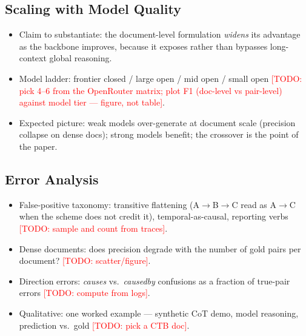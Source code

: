 \documentclass[11pt]{article}
\newcommand{\todo}[1]{\textcolor{red}{[TODO: #1]}}
\begin{document}
\subsection{Scaling with Model Quality}
\begin{itemize}
  \item Claim to substantiate: the document-level formulation \emph{widens} its
        advantage as the backbone improves, because it exposes rather than
        bypasses long-context global reasoning.
  \item Model ladder: frontier closed / large open / mid open / small open
        \todo{pick 4--6 from the OpenRouter matrix; plot F1 (doc-level vs
        pair-level) against model tier --- figure, not table}.
  \item Expected picture: weak models over-generate at document scale
        (precision collapse on dense docs); strong models benefit; the
        crossover is the point of the paper.
\end{itemize}

\subsection{Error Analysis}
\begin{itemize}
  \item False-positive taxonomy: transitive flattening (A$\to$B$\to$C read as
        A$\to$C when the scheme does not credit it), temporal-as-causal,
        reporting verbs \todo{sample and count from traces}.
  \item Dense documents: does precision degrade with the number of gold pairs
        per document? \todo{scatter/figure}.
  \item Direction errors: \textit{causes} vs.\ \textit{causedby} confusions
        as a fraction of true-pair errors \todo{compute from logs}.
  \item Qualitative: one worked example --- synthetic CoT demo, model reasoning,
        prediction vs.\ gold \todo{pick a CTB doc}.
\end{itemize}

\end{document}
